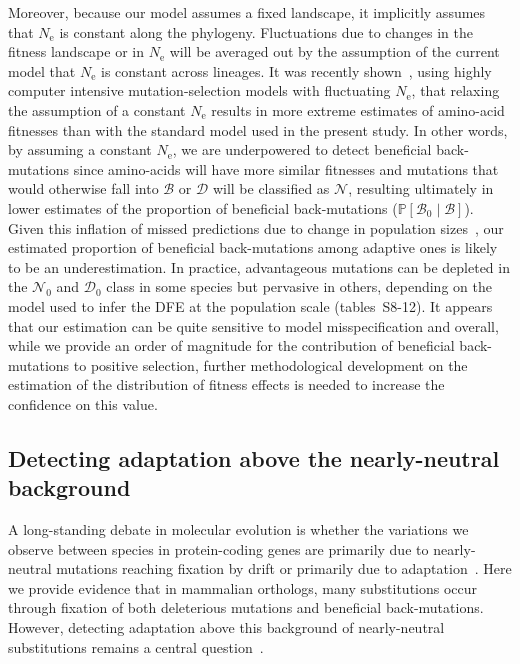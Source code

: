 \documentclass{article}
\newcommand{\Ne}{N_{\text{e}}}
\newcommand{\proba}{\mathbb{P}}
\newcommand{\SphyDel}{\mathcal{D}_0}
\newcommand{\SphyNeu}{\mathcal{N}_0}
\newcommand{\SphyBen}{\mathcal{B}_0}
\newcommand{\given}{\mid}
\newcommand{\SpopDel}{\mathcal{D}}
\newcommand{\SpopNeu}{\mathcal{N}}
\newcommand{\SpopBen}{\mathcal{B}}
\begin{document}
    Moreover, because our model assumes a fixed landscape, it implicitly assumes that $\Ne$ is constant along the phylogeny.
    Fluctuations due to changes in the fitness landscape or in $\Ne$ will be averaged out by the assumption of the current model that $\Ne$ is constant across lineages.
    It was recently shown~\cite{latrille_inferring_2021}, using highly computer intensive mutation-selection models with fluctuating $\Ne$, that relaxing the assumption of a constant $\Ne$ results in more extreme estimates of amino-acid fitnesses than with the standard model used in the present study.
    In other words, by assuming a constant $\Ne$, we are underpowered to detect beneficial back-mutations since amino-acids will have more similar fitnesses and mutations that would otherwise fall into $\SpopBen$ or $\SpopDel$ will be classified as $\SpopNeu$, resulting ultimately in lower estimates of the proportion of beneficial back-mutations ($\proba [ \SphyBen  \given  \SpopBen]$).
    Given this inflation of missed predictions due to change in population sizes~\cite{lanfear_population_2014, jones_shifting_2017, platt_protein_2018}, our estimated proportion of beneficial back-mutations among adaptive ones is likely to be an underestimation.
    In practice, advantageous mutations can be depleted in the $\SphyNeu$ and $\SphyDel$ class in some species but pervasive in others, depending on the model used to infer the DFE at the population scale (tables~S8-12).
    It appears that our estimation can be quite sensitive to model misspecification and overall, while we provide an order of magnitude for the contribution of beneficial back-mutations to positive selection, further methodological development on the estimation of the distribution of fitness effects is needed to increase the confidence on this value.

    \subsection*{Detecting adaptation above the nearly-neutral background}

    A long-standing debate in molecular evolution is whether the variations we observe between species in protein-coding genes are primarily due to nearly-neutral mutations reaching fixation by drift or primarily due to adaptation~\cite{kimura_evolutionary_1968,jensen_importance_2019,gillespie_substitution_1994,Ohta1992}.
    Here we provide evidence that in mammalian orthologs, many substitutions occur through fixation of both deleterious mutations and beneficial back-mutations.
    However, detecting adaptation above this background of nearly-neutral substitutions remains a central question~\cite{kimura_evolutionary_1968,ohta_development_1996}.
\end{document}
